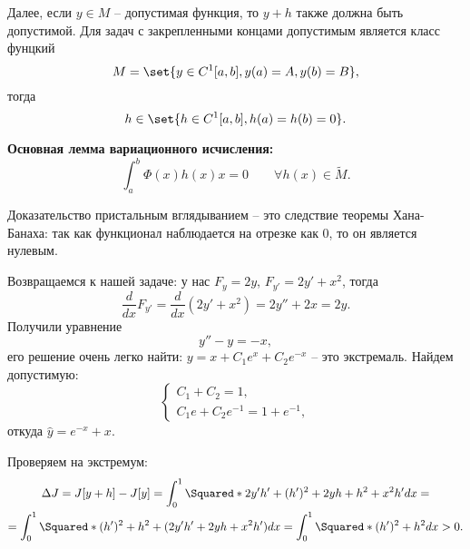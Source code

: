 Далее, если $y \in M$ -- допустимая функция, то $y + h$ также должна быть допустимой. Для задач с закрепленными концами допустимым является класс фунцкий
\begin{equation*}
    M = \set{y \in C^1[a, b], y(a) = A, y(b) = B},
\end{equation*}
тогда
\begin{equation*}
    h \in \set{h \in C^1[a, b], h(a) = h(b) = 0}.
\end{equation*}

\textbf{Основная лемма вариационного исчисления:} 
\begin{equation*}
    \int_a^b \Phi(x)h(x) x = 0 \hspace{2em}\forall h(x) \in \tilde{M}.
\end{equation*}

Доказательство пристальным вглядыванием -- это следствие теоремы Хана-Банаха: так как функционал наблюдается на отрезке как 0, то он является нулевым.

Возвращаемся к нашей задаче: у нас $F_y = 2y$, $F_{y'} = 2y' + x^2$, тогда
\begin{equation*}
    \frac{d}{dx}F_{y'} = \frac{d}{dx}(2y' + x^2) = 2y'' + 2x = 2y.
\end{equation*}
Получили уравнение
\begin{equation*}
    y'' - y = -x,
\end{equation*}
его решение очень легко найти: $y = x + C_1e^x + C_2e^{-x}$ -- это экстремаль. Найдем допустимую:
\begin{equation*}
    \begin{cases}
        C_1 + C_2 = 1, \\ C_1e + C_2e^{-1} = 1 + e^{-1},
    \end{cases}
\end{equation*}
откуда $\hat{y} = e^{-x} + x$.

Проверяем на экстремум:
\begin{multline*}
    \Delta J = J[y + h] - J[y] = \int_0^1 \Squared*{2y'h' + (h')^2 + 2yh + h^2 + x^2h'}dx = \\ = \int_0^1 \Squared*{(h')^2 + h^2 + (2y'h' + 2yh + x^2h')}dx = \int_0^1 \Squared*{(h')^2 + h^2}dx > 0.
\end{multline*}


















 





































